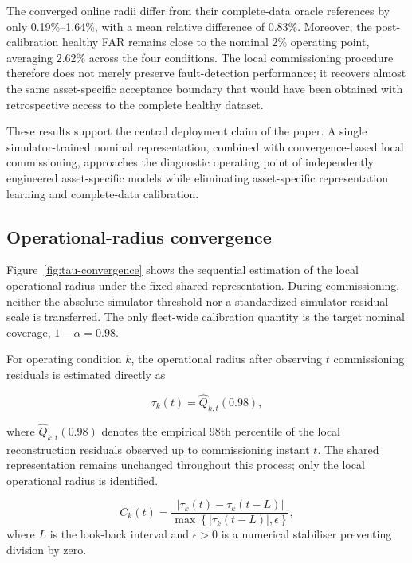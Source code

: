 \documentclass{trbunofficial}
\begin{document}
The converged online radii differ from their complete-data oracle references
by only 0.19\%--1.64\%, with a mean relative difference of 0.83\%.
Moreover, the post-calibration healthy FAR remains close to the nominal
2\% operating point, averaging 2.62\% across the four conditions. The local
commissioning procedure therefore does not merely preserve fault-detection
performance; it recovers almost the same asset-specific acceptance boundary
that would have been obtained with retrospective access to the complete
healthy dataset.

These results support the central deployment claim of the paper. A single
simulator-trained nominal representation, combined with convergence-based
local commissioning, approaches the diagnostic operating point of
independently engineered asset-specific models while eliminating
asset-specific representation learning and complete-data calibration.

\subsection{Operational-radius convergence}
\label{sec:radius-convergence-results}

Figure~\ref{fig:tau-convergence} shows the sequential estimation of the
local operational radius under the fixed shared representation. During
commissioning, neither the absolute simulator threshold nor a standardized
simulator residual scale is transferred. The only fleet-wide calibration
quantity is the target nominal coverage,
$1-\alpha=0.98$.

For operating condition $k$, the operational radius after observing $t$
commissioning residuals is estimated directly as

\begin{equation}
\tau_k(t)
=
\widehat{Q}_{k,t}(0.98),
\label{eq:tau-online-p98}
\end{equation}

where $\widehat{Q}_{k,t}(0.98)$ denotes the empirical 98th percentile of
the local reconstruction residuals observed up to commissioning instant
$t$. The shared representation remains unchanged throughout this process;
only the local operational radius is identified.

\begin{equation}
C_k(t)
=
\frac{
\left|\tau_k(t)-\tau_k(t-L)\right|
}{
\max\left\{\left|\tau_k(t-L)\right|,\epsilon\right\}
},
\label{eq:convergence}
\end{equation}
where $L$ is the look-back interval and $\epsilon>0$ is a numerical
stabiliser preventing division by zero.
\end{document}
